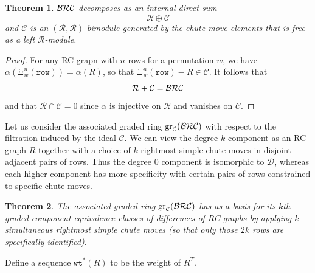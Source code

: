 \documentclass{amsart}
\newtheorem{theorem}{Theorem}[section]
\theoremstyle{definition}
\theoremstyle{remark}
\numberwithin{equation}{subsection}
\newcommand{\wtt}{\mathtt{wt}}
\newcommand{\dsch}{\ensuremath{\Xi}}
\newcommand{\dcoma}{\mathcal{D}}
\begin{document}
\begin{theorem}
  $\mathcal{BRC}$ decomposes as an internal direct sum
  $$\mathcal{R}\oplus \mathcal{C}$$
  and $\mathcal{C}$ is an $(\mathcal{R},\mathcal{R})$-bimodule generated by the chute move elements that is free as a left $\mathcal{R}$-module.
\end{theorem}
\begin{proof}
For any RC grapn with $n$ rows for a permutation $w$, we have $\alpha(\dsch_w^n(\mathtt{row})) = \alpha(R)$, so that $\dsch_w^n(\mathtt{row}) - R\in \mathcal{C}$. It follows that
$$\mathcal{R}+\mathcal{C}=\mathcal{BRC}$$ 
and that $\mathcal{R}\cap \mathcal{C} = 0$ since $\alpha$ is injective on $\mathcal{R}$ and vanishes on $\mathcal{C}$.
\end{proof}

\newcommand{\gra}{\mathrm{gr}_{\mathcal{C}}(\BRC)}
Let us consider the associated graded ring $\gra$ with respect to the filtration induced by the ideal $\mathcal{C}$. We can view the degree $k$ component as an RC graph $R$ together with a choice of $k$ rightmost simple chute moves in disjoint adjacent pairs of rows. Thus the degree $0$ component is isomorphic to $\dcoma$, whereas each higher component has more specificity with certain pairs of rows constrained to specific chute moves.
\begin{theorem}
The associated graded ring $\gra$ has as a basis for its $k$th graded component equivalence classes of differences of RC graphs by applying $k$ simultaneous rightmost simple chute moves (so that only those $2k$ rows are specifically identified).
\end{theorem}

Define a sequence $\wtt^*(R)$ to be the weight of $R^T$.
\end{document}
